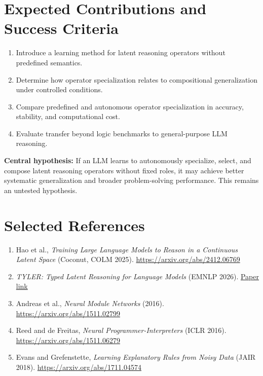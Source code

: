 \documentclass[11pt,a4paper]{article}
\begin{document}
\section{Expected Contributions and Success Criteria}
\begin{enumerate}
\item Introduce a learning method for latent reasoning operators without predefined semantics.
\item Determine how operator specialization relates to compositional generalization under controlled conditions.
\item Compare predefined and autonomous operator specialization in accuracy, stability, and computational cost.
\item Evaluate transfer beyond logic benchmarks to general-purpose LLM reasoning.
\end{enumerate}
\textbf{Central hypothesis:} If an LLM learns to autonomously specialize, select, and compose latent reasoning operators without fixed roles, it may achieve better systematic generalization and broader problem-solving performance. This remains an untested hypothesis.

\section*{Selected References}
\begin{enumerate}[leftmargin=1.8em]
\item Hao et al., \emph{Training Large Language Models to Reason in a Continuous Latent Space} (Coconut, COLM 2025). \url{https://arxiv.org/abs/2412.06769}
\item \emph{TYLER: Typed Latent Reasoning for Language Models} (EMNLP 2026). \href{https://aclanthology.org/2026.emnlp-main.2004/}{Paper link}
\item Andreas et al., \emph{Neural Module Networks} (2016). \url{https://arxiv.org/abs/1511.02799}
\item Reed and de Freitas, \emph{Neural Programmer-Interpreters} (ICLR 2016). \url{https://arxiv.org/abs/1511.06279}
\item Evans and Grefenstette, \emph{Learning Explanatory Rules from Noisy Data} (JAIR 2018). \url{https://arxiv.org/abs/1711.04574}
\end{enumerate}
\end{document}
